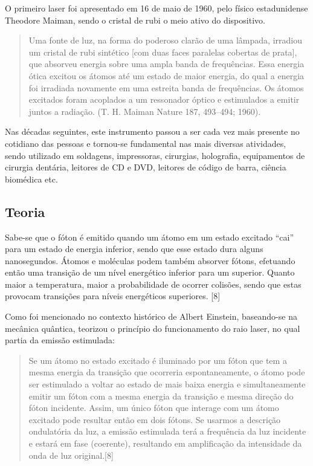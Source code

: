 O primeiro laser foi apresentado em 16 de maio de 1960, pelo físico estadunidense Theodore Maiman, sendo o cristal de rubi o meio ativo do dispositivo.

\begin{quote}
Uma fonte de luz, na forma do poderoso clarão de uma lâmpada, irradiou um cristal de rubi sintético [com duas faces paralelas cobertas de prata], que absorveu energia sobre uma ampla banda de frequências. Essa energia ótica excitou os átomos até um estado de maior energia, do qual a energia foi irradiada novamente em uma estreita banda de frequências. Os átomos excitados foram acoplados a um ressonador óptico e estimulados a emitir juntos a radiação. (T. H. Maiman Nature 187, 493–494; 1960).
\end{quote}

Nas décadas seguintes, este instrumento passou a ser cada vez mais presente no cotidiano das pessoas e tornou-se fundamental nas mais diversas atividades, sendo utilizado em soldagens, impressoras, cirurgias, holografia, equipamentos de cirurgia dentária, leitores de CD e DVD, leitores de código de barra, ciência biomédica etc.

\subsection{Teoria}

Sabe-se que o fóton é emitido quando um átomo em um estado excitado ``cai'' para um estado de energia inferior, sendo que esse estado dura alguns nanosegundos. Átomos e moléculas podem também absorver fótons, efetuando então uma transição de um nível energético inferior para um superior. Quanto maior a temperatura, maior a probabilidade de ocorrer colisões, sendo que estas provocam transições para níveis energéticos superiores. [8]

Como foi mencionado no contexto histórico de Albert Einstein, baseando-se na mecânica quântica, teorizou o princípio do funcionamento do raio laser, no qual partia da emissão estimulada:

\begin{quote}
Se um átomo no estado excitado é iluminado por um fóton que tem a mesma energia da transição que ocorreria espontaneamente, o átomo pode ser estimulado a voltar ao estado de mais baixa energia e simultaneamente emitir um fóton com a mesma energia da transição e mesma direção do fóton incidente. Assim, um único fóton que interage com um átomo excitado pode resultar então em dois fótons. Se usarmos a descrição ondulatória da luz, a emissão estimulada terá a frequência da luz incidente e estará em fase (coerente), resultando em amplificação da intensidade da onda de luz original.[8]
\end{quote}

